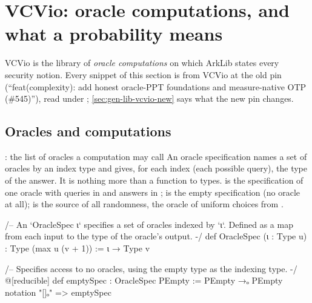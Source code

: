 \begingroup\sloppy
\section{VCVio: oracle computations, and what a probability means}\label{sec:gen-lib-vcvio}

VCVio is the library of \emph{oracle computations} on which ArkLib states every security notion.
Every snippet of this section is from VCVio at the old pin  (\enquote{feat(complexity):
add honest oracle-PPT foundations and measure-native OTP (\#545)}), read under
\allowbreak{}\allowbreak{}; \cref{sec:gen-lib-vcvio-new} says what the new pin 
changes.

\subsection{Oracles and computations}\label{sec:gen-lib-vcvio-comp}

\begin{define}{: the list of oracles a computation may call}
An oracle specification names a set of oracles by an index type  and gives, for each
index (each possible query), the type of the answer. It is nothing more than a function to
types.  is the specification of one oracle with queries in  and answers in
;  is the empty specification (no oracle at all);  is the source
of all randomness, the oracle of uniform choices from .
\end{define}

\begin{leancode}
/-- An `OracleSpec ι` specifies a set of oracles indexed by `ι`.
Defined as a map from each input to the type of the oracle's output. -/
def OracleSpec (ι : Type u) : Type (max u (v + 1)) :=
  ι → Type v
\end{leancode}



\begin{leancode}
/-- Specifies access to no oracles, using the empty type as the indexing type. -/
@[reducible] def emptySpec : OracleSpec PEmpty := PEmpty →ₒ PEmpty
notation "[]ₒ" => emptySpec
\end{leancode}

